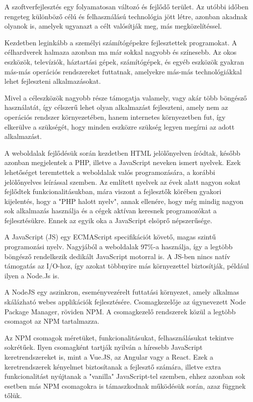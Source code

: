 
A szoftverfejlesztés egy folyamatosan változó és fejlődő terület. Az utóbbi időben rengeteg különböző célú és felhasználású technológia jött létre, azonban akadnak olyanok is, amelyek ugyanazt a célt valósítják meg, más megközelítéssel.

Kezdetben leginkább a személyi számítógépekre fejlesztettek programokat. A célhardverek halmaza azonban ma már sokkal nagyobb és színesebb. Az okos eszközök, televíziók, háztartási gépek, számítógépek, és egyéb eszközök gyakran más-más operációs rendszereket futtatnak, amelyekre más-más technológiákkal lehet fejleszteni alkalmazásokat.

Mivel a céleszközök nagyobb része támogatja valamely, vagy akár több böngésző használatát, így célszerű lehet olyan alkalmazást fejleszteni, amely nem az operációs rendszer környezetében, hanem internetes környezetben fut, így elkerülve a szükségét, hogy minden eszközre szükség legyen megírni az adott alkalmazást.

A weboldalak fejlődésük során kezdetben HTML jelölőnyelven íródtak, később azonban megjelentek a PHP, illetve a JavaScript neveken ismert nyelvek. Ezek  lehetőséget teremtettek a weboldalak valós programozására, a korábbi jelölőnyelves leírással szemben. Az említett nyelvek az évek alatt nagyon sokat fejlődtek funkcionalitásukban, mára viszont a fejlesztők körében gyakori kijelentés, hogy a "PHP halott nyelv", annak ellenére, hogy még mindig nagyon sok alkalmazás használja és a cégek aktívan keresnek programozókat a fejlesztésükre. Ennek az egyik oka a JavaScript elsöprő népszerűsége.

A  JavaScript (JS) egy ECMAScript specifikációt követő, magas szintű programozási nyelv. Nagyjából a weboldalak 97\%-a használja, így a legtöbb böngésző rendelkezik dedikált JavaScript motorral is. A JS-ben nincs natív támogatás az I/O-hoz, így azokat többnyire más környezettel biztosítják, például ilyen a Node.Js is. \cite{javascript}

A NodeJS egy aszinkron, eseményvezérelt futtatási környezet, amely alkalmas skálázható webes applikációk fejlesztésére. Csomagkezelője az úgynevezett Node Package Manager, röviden NPM. A csomagkezelő rendszerek közül a legtöbb csomagot az NPM tartalmazza.

Az NPM csomagok méretüket, funkcionalitásukat, felhasználásukat tekintve sokrétűek. Ilyen csomagként tartják nyilván a híresebb JavaScript keretrendszereket is, mint a Vue.JS, az Angular vagy a React. Ezek a keretrendszerek kényelmet biztosítanak a fejlesztő számára, illetve extra funkcionalitást nyújtanak a "vanilla" JavaScript-tel szemben, ehhez azonban sok esetben más NPM csomagokra is támaszkodnak működésük során, azaz függnek tőlük.

